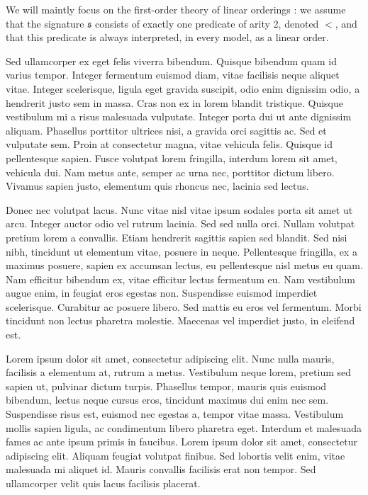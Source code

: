 \documentclass{fancy-article}
\begin{document}
\AP We will maintly focus on the first-order theory of linear orderings
\cite{rosenstein1982linear}: we assume that the signature $\mathfrak{s}$
consists of exactly one predicate of arity 2, denoted $<$, and that this
predicate is always interpreted, in every model, as a linear order.


\AP Sed ullamcorper ex eget felis viverra bibendum. Quisque bibendum quam id varius tempor. Integer fermentum euismod diam, vitae facilisis neque aliquet vitae. Integer scelerisque, ligula eget gravida suscipit, odio enim dignissim odio, a hendrerit justo sem in massa. Cras non ex in lorem blandit tristique. Quisque vestibulum mi a risus malesuada vulputate. Integer porta dui ut ante dignissim aliquam. Phasellus porttitor ultrices nisi, a gravida orci sagittis ac. Sed et vulputate sem. Proin at consectetur magna, vitae vehicula felis. Quisque id pellentesque sapien. Fusce volutpat lorem fringilla, interdum lorem sit amet, vehicula dui. Nam metus ante, semper ac urna nec, porttitor dictum libero. Vivamus sapien justo, elementum quis rhoncus nec, lacinia sed lectus.

\AP Donec nec volutpat lacus. Nunc vitae nisl vitae ipsum sodales porta sit amet ut arcu. Integer auctor odio vel rutrum lacinia. Sed sed nulla orci. Nullam volutpat pretium lorem a convallis. Etiam hendrerit sagittis sapien sed blandit. Sed nisi nibh, tincidunt ut elementum vitae, posuere in neque. Pellentesque fringilla, ex a maximus posuere, sapien ex accumsan lectus, eu pellentesque nisl metus eu quam. Nam efficitur bibendum ex, vitae efficitur lectus fermentum eu. Nam vestibulum augue enim, in feugiat eros egestas non. Suspendisse euismod imperdiet scelerisque. Curabitur ac posuere libero. Sed mattis eu eros vel fermentum. Morbi tincidunt non lectus pharetra molestie. Maecenas vel imperdiet justo, in eleifend est.

\AP Lorem ipsum dolor sit amet, consectetur adipiscing elit. Nunc nulla mauris, facilisis a elementum at, rutrum a metus. Vestibulum neque lorem, pretium sed sapien ut, pulvinar dictum turpis. Phasellus tempor, mauris quis euismod bibendum, lectus neque cursus eros, tincidunt maximus dui enim nec sem. Suspendisse risus est, euismod nec egestas a, tempor vitae massa. Vestibulum mollis sapien ligula, ac condimentum libero pharetra eget. Interdum et malesuada fames ac ante ipsum primis in faucibus. Lorem ipsum dolor sit amet, consectetur adipiscing elit. Aliquam feugiat volutpat finibus. Sed lobortis velit enim, vitae malesuada mi aliquet id. Mauris convallis facilisis erat non tempor. Sed ullamcorper velit quis lacus facilisis placerat.
\end{document}
